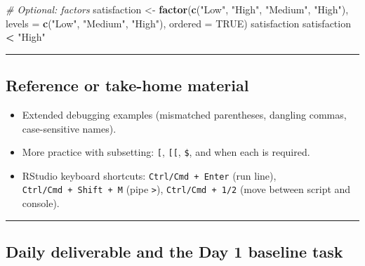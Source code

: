 \documentclass[11pt]{article}
\newenvironment{Shaded}{\begin{snugshade}}{\end{snugshade}}
\newcommand{\AttributeTok}[1]{\textcolor[rgb]{0.13,0.29,0.53}{#1}}
\newcommand{\CommentTok}[1]{\textcolor[rgb]{0.56,0.35,0.01}{\textit{#1}}}
\newcommand{\ConstantTok}[1]{\textcolor[rgb]{0.56,0.35,0.01}{#1}}
\newcommand{\FunctionTok}[1]{\textcolor[rgb]{0.13,0.29,0.53}{\textbf{#1}}}
\newcommand{\NormalTok}[1]{#1}
\newcommand{\OtherTok}[1]{\textcolor[rgb]{0.56,0.35,0.01}{#1}}
\newcommand{\SpecialCharTok}[1]{\textcolor[rgb]{0.81,0.36,0.00}{\textbf{#1}}}
\newcommand{\StringTok}[1]{\textcolor[rgb]{0.31,0.60,0.02}{#1}}
\providecommand{\tightlist}{%
  \setlength{\itemsep}{0pt}\setlength{\parskip}{0pt}}
\begin{document}
\begin{Shaded}
\begin{Highlighting}[]
\CommentTok{\# Optional: factors}
\NormalTok{satisfaction }\OtherTok{\textless{}{-}} \FunctionTok{factor}\NormalTok{(}\FunctionTok{c}\NormalTok{(}\StringTok{"Low"}\NormalTok{, }\StringTok{"High"}\NormalTok{, }\StringTok{"Medium"}\NormalTok{, }\StringTok{"High"}\NormalTok{),}
                        \AttributeTok{levels =} \FunctionTok{c}\NormalTok{(}\StringTok{"Low"}\NormalTok{, }\StringTok{"Medium"}\NormalTok{, }\StringTok{"High"}\NormalTok{), }\AttributeTok{ordered =} \ConstantTok{TRUE}\NormalTok{)}
\NormalTok{satisfaction}
\NormalTok{satisfaction }\SpecialCharTok{\textless{}} \StringTok{"High"}
\end{Highlighting}
\end{Shaded}

\begin{center}\rule{0.5\linewidth}{0.5pt}\end{center}

\hypertarget{reference-or-take-home-material}{%
\subsection{Reference or take-home
material}\label{reference-or-take-home-material}}

\begin{itemize}
\tightlist
\item
  Extended debugging examples (mismatched parentheses, dangling commas,
  case-sensitive names).
\item
  More practice with subsetting: \texttt{{[}}, \texttt{{[}{[}},
  \texttt{\$}, and when each is required.
\item
  RStudio keyboard shortcuts: \texttt{Ctrl/Cmd\ +\ Enter} (run line),
  \texttt{Ctrl/Cmd\ +\ Shift\ +\ M} (pipe
  \texttt{\textbar{}\textgreater{}}), \texttt{Ctrl/Cmd\ +\ 1/2} (move
  between script and console).
\end{itemize}

\begin{center}\rule{0.5\linewidth}{0.5pt}\end{center}

\hypertarget{daily-deliverable-and-the-day-1-baseline-task}{%
\subsection{Daily deliverable and the Day 1 baseline
task}\label{daily-deliverable-and-the-day-1-baseline-task}}
\end{document}

